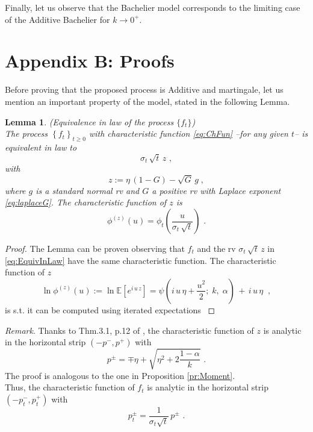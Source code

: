 \documentclass[12pt]{article}
\newtheorem{lemma}[theorem]{Lemma}
\theoremstyle{definition}
\theoremstyle{remark}
\numberwithin{theorem}{section}
\numberwithin{proposition}{section}
\numberwithin{lemma}{section}
\numberwithin{corollary}{section}
\numberwithin{definition}{section}
\numberwithin{remark}{section}
\numberwithin{example}{section}
\newcommand{\be}{\begin{equation}}
\newcommand{\en}{\end{equation}}
\begin{document}
\smallskip

Finally, let us observe that
the Bachelier model corresponds to the limiting case of the Additive Bachelier for $k \to 0^+$.

\section*{Appendix B: Proofs}
\label{app:Proofs}
Before proving that the proposed process is Additive and martingale, 
let us mention an important property of the model, stated in the following Lemma.

\smallskip
\setcounter{lemma}{0}
{
\renewcommand{\thelemma}{B.\arabic{lemma}}
\begin{lemma} {\rm (Equivalence in law of the process $\{ f_t \}$)}\label{lem:f_equivalence}\\
The process $ \left\{f_t \right\}_{t\geq 0}$ with characteristic function \eqref{eq:ChFun} --for any given $t$-- is equivalent in law to
\be
\label{eq:EquivInLaw}
{\sigma }_t \, \sqrt{ t} \, z\,\,,
\en
with
\begin{equation}
\label{eq:z_rv}
z:= \eta \,  (1 - G) -    \sqrt{G} \, g \; ,    
\end{equation}
where $g$ is a standard normal rv and $G$ a positive rv with Laplace exponent \eqref{eq:laplaceG}. The characteristic function of $z$ is
\begin{equation*}
\phi^{(z)}(u)=\phi_t\left(\frac{u}{\sigma_t\,\sqrt{t}}\right)\,\,.
\end{equation*}
\end{lemma}
}
\begin{proof}
The Lemma can be proven observing that $f_t$ and the rv ${\sigma }_t \, \sqrt{ t} \, z$ in \eqref{eq:EquivInLaw}
have the same characteristic function. The characteristic function of $z$
\begin{equation*}
	\ln \phi^{(z)}(u):= \ln \mathbb{E}\left[e^{ i \, u \, z}\right]=\psi\left(i \, u \, \eta+\frac{u^2 }{2} ; \; k, \; \alpha \right) \, + \,
 i\, u \, \eta\;\;,
\end{equation*}
is s.t. it can be computed using iterated expectations 
 \citep[see, e.g.,][Sect.3.2.2, p.77]{mcneil2015}

\end{proof}

\smallskip

{\it Remark}.
Thanks to Thm.3.1, p.12 of \cite{lukacs1972}, the characteristic function of $z$ is analytic in the horizontal strip $(-p^-,p^+)$ with
\begin{equation}
\label{eq:p_plus_minus}
p^\pm=\mp\eta+\sqrt{\eta^2+2\frac{1-\alpha}{k}}\,\,.
\end{equation}
The proof is analogous to the one in Proposition \ref{pr:Moment}.\\
Thus, the characteristic function of $f_t$ is analytic in the horizontal strip $(-p_t^-,p_t^+)$ with
\begin{equation}
p_t^\pm=\frac{1}{\sigma_t\sqrt{t}}\,p^\pm\,\,.
\end{equation}
\end{document}
